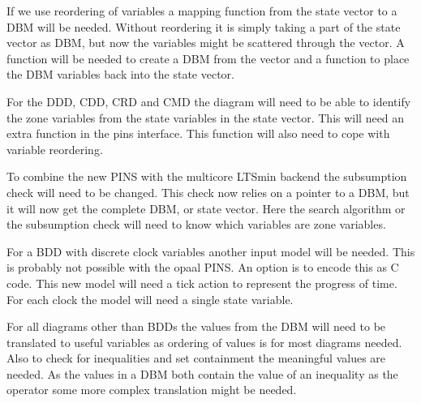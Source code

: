 \documentclass[11pt]{article}
\begin{document}
If we use reordering of variables a mapping function from the state vector to a DBM will be needed. Without reordering it is simply taking a part of the state vector as DBM, but now the variables might be scattered through the vector. A function will be needed to create a DBM from the vector and a function to place the DBM variables back into the state vector.

For the DDD, CDD, CRD and CMD the diagram will need to be able to identify the zone variables from the state variables in the state vector. This will need an extra function in the pins interface. This function will also need to cope with variable reordering. 

To combine the new PINS with the multicore LTSmin backend the subsumption check will need to be changed. This check now relies on a pointer to a DBM, but it will now get the complete DBM, or state vector. Here the search algorithm or the subsumption check will need to know which variables are zone variables.

For a BDD with discrete clock variables another input model will be needed. This is probably not possible with the opaal PINS. An option is to encode this as C code. This new model will need a tick action to represent the progress of time. For each clock the model will need a single state variable. 

For all diagrams other than BDDs the values from the DBM will need to be translated to useful variables as ordering of values is for most diagrams needed. Also to check for inequalities and set containment the meaningful values are needed. As the values in a DBM both contain the value of an inequality as the operator some more complex translation might be needed. 

{}

\end{document}
